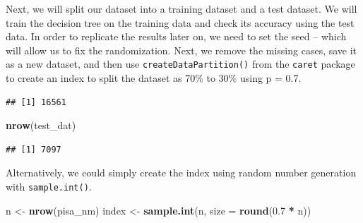 \documentclass[]{book}
\newenvironment{Shaded}{\begin{snugshade}}{\end{snugshade}}
\newcommand{\CommentTok}[1]{\textcolor[rgb]{0.56,0.35,0.01}{\textit{#1}}}
\newcommand{\DataTypeTok}[1]{\textcolor[rgb]{0.13,0.29,0.53}{#1}}
\newcommand{\DecValTok}[1]{\textcolor[rgb]{0.00,0.00,0.81}{#1}}
\newcommand{\FloatTok}[1]{\textcolor[rgb]{0.00,0.00,0.81}{#1}}
\newcommand{\KeywordTok}[1]{\textcolor[rgb]{0.13,0.29,0.53}{\textbf{#1}}}
\newcommand{\NormalTok}[1]{#1}
\newcommand{\OperatorTok}[1]{\textcolor[rgb]{0.81,0.36,0.00}{\textbf{#1}}}
\newcommand{\OtherTok}[1]{\textcolor[rgb]{0.56,0.35,0.01}{#1}}
\newcommand{\StringTok}[1]{\textcolor[rgb]{0.31,0.60,0.02}{#1}}
\begin{document}
Next, we will split our dataset into a training dataset and a test dataset. We will train the decision tree on the training data and check its accuracy using the test data. In order to replicate the results later on, we need to set the seed -- which will allow us to fix the randomization. Next, we remove the missing cases, save it as a new dataset, and then use \texttt{createDataPartition()} from the \texttt{caret} package to create an index to split the dataset as 70\% to 30\% using p = 0.7.

\begin{Shaded}
\end{Shaded}

\begin{verbatim}
## [1] 16561
\end{verbatim}

\begin{Shaded}
\begin{Highlighting}[]
\KeywordTok{nrow}\NormalTok{(test_dat)}
\end{Highlighting}
\end{Shaded}

\begin{verbatim}
## [1] 7097
\end{verbatim}

Alternatively, we could simply create the index using random number generation with \texttt{sample.int()}.

\begin{Shaded}
\begin{Highlighting}[]
\NormalTok{n <-}\StringTok{ }\KeywordTok{nrow}\NormalTok{(pisa_nm)}
\NormalTok{index <-}\StringTok{ }\KeywordTok{sample.int}\NormalTok{(n, }\DataTypeTok{size =} \KeywordTok{round}\NormalTok{(}\FloatTok{0.7} \OperatorTok{*}\StringTok{ }\NormalTok{n))}
\end{Highlighting}
\end{Shaded}
\end{document}
